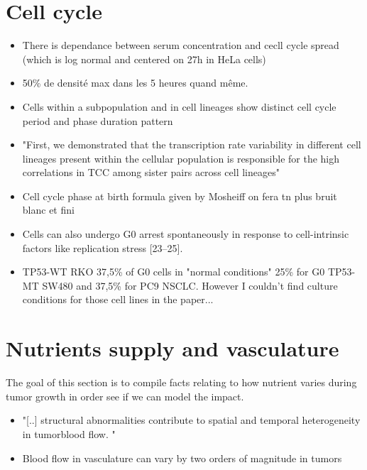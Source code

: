 \documentclass[11pt,a4paper]{article}
\begin{document}
\section{Cell cycle}
\begin{itemize}
\item There is dependance between serum concentration and cecll cycle spread (which is log normal and centered on 27h in HeLa cells)\cite{Govindaraj2022}
\item 50\% de densité max dans les 5 heures quand même. \cite{Govindaraj2022}

\item Cells within a subpopulation and in cell lineages show distinct cell cycle period and phase duration pattern\cite{Govindaraj2022}

\item "First, we demonstrated that the
transcription rate variability in different cell lineages present within the cellular population is
responsible for the high correlations in TCC among sister pairs across cell lineages"\cite{Govindaraj2022}

\item Cell cycle phase at birth formula given by Mosheiff on fera tn plus bruit blanc et fini

\item Cells can also undergo G0 arrest spontaneously in response to cell-intrinsic factors like replication stress [23–25].\cite{Wiecek2023} 

\item TP53-WT RKO 37,5\% of G0 cells in "normal conditions"
25\% for G0 TP53-MT SW480 and 37,5\% for PC9 NSCLC. However I couldn't find culture conditions for those cell lines in the paper...
\end{itemize}

\section{Nutrients supply and vasculature}
The goal of this section is to compile facts relating to how nutrient varies during tumor growth in order see if we can model the impact.
\begin{itemize}
\item "[..] structural abnormalities contribute to spatial and temporal heterogeneity in tumorblood flow. "\cite{Jain2005}
\item Blood flow in vasculature can vary by two orders of magnitude in tumors \cite{Vaupel1990}
\end{itemize}
\end{document}
